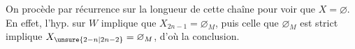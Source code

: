 
On procède par récurrence sur la longueur de cette chaîne pour voir que $X=\varnothing$. En effet, l'hyp. sur $W$ implique que $X_{2n-1}=\varnothing_M$, puis celle que $\varnothing_M$ est strict implique $X_{\unsure{2-n|2n-2}}=\varnothing_M$, d'où la conclusion.

